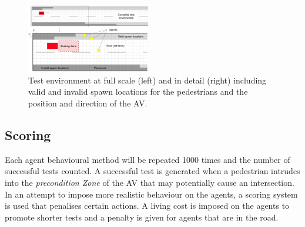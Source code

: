 \documentclass[letterpaper, 10 pt, journal, twoside]{IEEEtran}
\begin{document}



\begin{figure}[!t]
	\centering
\includegraphics[width=0.48\textwidth]{RoadLayout.pdf}
	\caption{Test environment at full scale (left) and in detail (right) including valid and invalid spawn locations for the pedestrians and the position and direction of the AV.}
	\label{gridRoad}
\end{figure}



\subsection{Scoring}
Each agent behavioural method will be repeated 1000 times and the number of successful tests counted. A successful test is generated when a pedestrian intrudes into the \textit{precondition Zone} of the AV that may potentially cause an intersection. %
In an attempt to impose more realistic behaviour on the agents, a scoring system is used that penalises certain actions. A living cost is imposed on the agents to promote shorter tests and a penalty is given for agents that are in the road.
\end{document}
